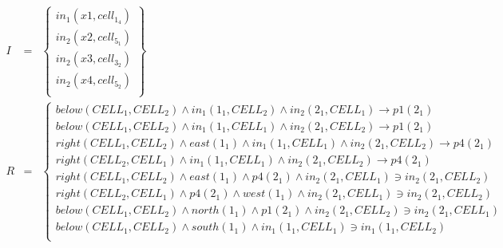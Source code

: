 \begin{eqnarray*}
I & = & \left\{ \begin{array}{l}
\mathit{in}_1(\mathit{x}1,\mathit{cell}_1_4)\\
\mathit{in}_2(\mathit{x}2,\mathit{cell}_5_1)\\
\mathit{in}_2(\mathit{x}3,\mathit{cell}_3_2)\\
\mathit{in}_2(\mathit{x}4,\mathit{cell}_5_2)\\
\end{array}\right\}\\
R & = &  \left\{ \begin{array}{l}
\mathit{below}(\mathit{CELL}_1,\mathit{CELL}_2) \wedge \mathit{in}_1(\mathit{}1_1,\mathit{CELL}_2) \wedge \mathit{in}_2(\mathit{}2_1,\mathit{CELL}_1) \rightarrow \mathit{p}1(\mathit{}2_1)\\
\mathit{below}(\mathit{CELL}_1,\mathit{CELL}_2) \wedge \mathit{in}_1(\mathit{}1_1,\mathit{CELL}_1) \wedge \mathit{in}_2(\mathit{}2_1,\mathit{CELL}_2) \rightarrow \mathit{p}1(\mathit{}2_1)\\
\mathit{right}(\mathit{CELL}_1,\mathit{CELL}_2) \wedge \mathit{east}(\mathit{}1_1) \wedge \mathit{in}_1(\mathit{}1_1,\mathit{CELL}_1) \wedge \mathit{in}_2(\mathit{}2_1,\mathit{CELL}_2) \rightarrow \mathit{p}4(\mathit{}2_1)\\
\mathit{right}(\mathit{CELL}_2,\mathit{CELL}_1) \wedge \mathit{in}_1(\mathit{}1_1,\mathit{CELL}_1) \wedge \mathit{in}_2(\mathit{}2_1,\mathit{CELL}_2) \rightarrow \mathit{p}4(\mathit{}2_1)\\
\mathit{right}(\mathit{CELL}_1,\mathit{CELL}_2) \wedge \mathit{east}(\mathit{}1_1) \wedge \mathit{p}4(\mathit{}2_1) \wedge \mathit{in}_2(\mathit{}2_1,\mathit{CELL}_1) \ni \mathit{in}_2(\mathit{}2_1,\mathit{CELL}_2)\\
\mathit{right}(\mathit{CELL}_2,\mathit{CELL}_1) \wedge \mathit{p}4(\mathit{}2_1) \wedge \mathit{west}(\mathit{}1_1) \wedge \mathit{in}_2(\mathit{}2_1,\mathit{CELL}_1) \ni \mathit{in}_2(\mathit{}2_1,\mathit{CELL}_2)\\
\mathit{below}(\mathit{CELL}_1,\mathit{CELL}_2) \wedge \mathit{north}(\mathit{}1_1) \wedge \mathit{p}1(\mathit{}2_1) \wedge \mathit{in}_2(\mathit{}2_1,\mathit{CELL}_2) \ni \mathit{in}_2(\mathit{}2_1,\mathit{CELL}_1)\\
\mathit{below}(\mathit{CELL}_1,\mathit{CELL}_2) \wedge \mathit{south}(\mathit{}1_1) \wedge \mathit{in}_1(\mathit{}1_1,\mathit{CELL}_1) \ni \mathit{in}_1(\mathit{}1_1,\mathit{CELL}_2)\\

\end{array}
\end{eqnarray*}
